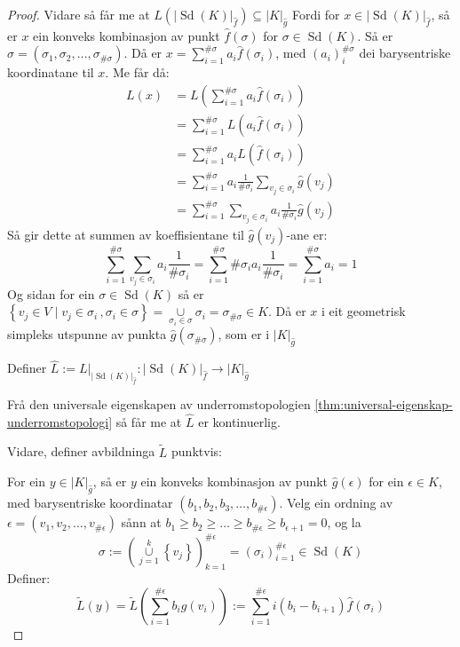 \documentclass[a4paper, 12pt, norsk]{article}
\theoremstyle{plain}
\theoremstyle{definition}
\newcommand{\union}{ \mathop{\cup}\limits }
\newcommand{\gr}[1]{ \lvert #1 \rvert } %
\newcommand{\set}[1]{ \left \{ #1 \right \} } %
\newcommand{\tuple}[1]{ \left( #1 \right) } %
\DeclareMathOperator{\Sd}{Sd}
\begin{document}
\begin{proof}
	Vidare så får me at \( L(\gr{\Sd(K)}_{\hat{f}}) \subseteq \gr{K}_{\hat{g}} \) Fordi for \( x \in \gr{\Sd(K)}_{\hat{f}} \), så er \( x \) ein konveks kombinasjon av punkt \( \hat{f}(\sigma) \) for \( \sigma \in \Sd(K) \). Så er \( \sigma = (\sigma_1, \sigma_2, \dots, \sigma_{\#\sigma}) \). Då er \( x = \sum_{i=1}^{\#\sigma} a_i \hat{f}(\sigma_i) \), med \( (a_i)_i^{\#\sigma} \) dei barysentriske koordinatane til \( x \). Me får då:
	\begin{align*}
		L(x) &= L\left(\sum_{i=1}^{\#\sigma} a_i \hat{f}(\sigma_i)\right) \\
		&= \sum_{i=1}^{\#\sigma} L(a_i \hat{f}(\sigma_i)) \\
		&= \sum_{i=1}^{\#\sigma} a_i L(\hat{f}(\sigma_i)) \\
		&= \sum_{i=1}^{\#\sigma} a_i \frac{1}{\#\sigma_i} \sum_{v_j \in \sigma_i} \hat{g}(v_j) \\
		&= \sum_{i=1}^{\#\sigma} \sum_{v_j \in \sigma_i} a_i \frac{1}{\#\sigma_i} \hat{g}(v_j)
	\end{align*}
	Så gir dette at summen av koeffisientane til \( \hat{g}(v_j) \)-ane er:
	\[
		\sum_{i=1}^{\#\sigma} \sum_{v_j \in \sigma_i} a_i \frac{1}{\#\sigma_i} = 
		\sum_{i=1}^{\#\sigma} \#\sigma_i a_i \frac{1}{\#\sigma_i} =
		\sum_{i=1}^{\#\sigma} a_i = 1
	\]
	Og sidan for ein \( \sigma \in \Sd(K) \) så er \( \set{v_j \in V \mid v_j \in \sigma_i \,, \sigma_i \in \sigma} = \union_{\sigma_i \in \sigma} \sigma_i = \sigma_{\#\sigma} \in K \). Då er \( x \) i eit geometrisk simpleks utspunne av punkta \( \hat{g}(\sigma_{\#\sigma}) \), som er i \( \gr{K}_{\hat{g}} \)

	Definer \( \hat{L} := L|_{\gr{\Sd(K)}_{\hat{f}}}: \gr{\Sd(K)}_{\hat{f}} \to \gr{K}_{\hat{g}} \)

	Frå den universale eigenskapen av underromstopologien \autoref{thm:universal-eigenskap-underromstopologi} så får me at \( \hat{L} \) er kontinuerlig.

	Vidare, definer avbildninga \( \tilde{L} \) punktvis:
	
	For ein \( y \in \gr{K}_{\hat{g}} \), så er \( y \) ein konveks kombinasjon av punkt \( \hat{g}(\epsilon) \) for ein \( \epsilon \in K \), med barysentriske koordinatar \( \tuple{b_1, b_2, b_3, \dots, b_{\#\epsilon}} \). Velg ein ordning av \( \epsilon = \tuple{v_1, v_2, \dots, v_{\#\epsilon}} \) sånn at \( b_1 \geq b_2 \geq \dots \geq b_{\#\epsilon} \geq  b_{\epsilon+1}=0 \), og la
	\[
		\sigma := \tuple{\union_{j=1}^k\set{v_j}}_{k=1}^{\#\epsilon} = \tuple{\sigma_i}_{i=1}^{\#\epsilon} \in \Sd(K)
	\]
	Definer:
	\[
		\tilde{L}(y) = \tilde{L}\tuple{\sum_{i=1}^{\#\epsilon} b_i \hat{g}(v_i)} := \sum_{i=1}^{\#\epsilon}i\tuple{b_i-b_{i+1}}\hat{f}(\sigma_i)
	\]


\end{proof}
\end{document}
